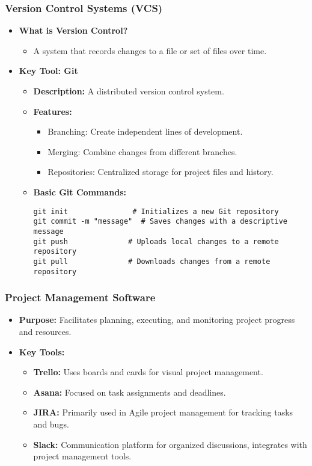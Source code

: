 \documentclass[aspectratio=169]{beamer}
\begin{document}
\begin{frame}[fragile]
    \frametitle{Version Control Systems (VCS)}
    \begin{itemize}
        \item \textbf{What is Version Control?}
            \begin{itemize}
                \item A system that records changes to a file or set of files over time.
            \end{itemize}
        \item \textbf{Key Tool: Git}
            \begin{itemize}
                \item \textbf{Description:} A distributed version control system.
                \item \textbf{Features:}
                    \begin{itemize}
                        \item Branching: Create independent lines of development.
                        \item Merging: Combine changes from different branches.
                        \item Repositories: Centralized storage for project files and history.
                    \end{itemize}
                \item \textbf{Basic Git Commands:}
                    \begin{lstlisting}
git init               # Initializes a new Git repository
git commit -m "message"  # Saves changes with a descriptive message
git push              # Uploads local changes to a remote repository
git pull              # Downloads changes from a remote repository
                    \end{lstlisting}
            \end{itemize}
    \end{itemize}
\end{frame}

\begin{frame}[fragile]
    \frametitle{Project Management Software}
    \begin{itemize}
        \item \textbf{Purpose:} Facilitates planning, executing, and monitoring project progress and resources.
        \item \textbf{Key Tools:}
            \begin{itemize}
                \item \textbf{Trello:} Uses boards and cards for visual project management.
                \item \textbf{Asana:} Focused on task assignments and deadlines.
                \item \textbf{JIRA:} Primarily used in Agile project management for tracking tasks and bugs.
                \item \textbf{Slack:} Communication platform for organized discussions, integrates with project management tools.
            \end{itemize}
    \end{itemize}
\end{frame}
\end{document}
